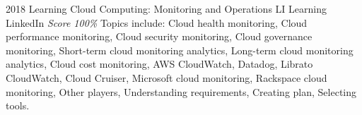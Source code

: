 \documentclass[11pt,a4paper]{moderncv}
\begin{document}
\cventry
    {2018}
    {Learning Cloud Computing: Monitoring and Operations}
    {LI Learning}
    {LinkedIn}
    {\textit{Score 100\%}}
    {
        Topics include:                                                                                           %
            Cloud health monitoring,                                                                              %
            Cloud performance monitoring,                                                                         %
            Cloud security monitoring,                                                                            %
            Cloud governance monitoring,                                                                          %
            Short-term cloud monitoring analytics,                                                                %
            Long-term cloud monitoring analytics,                                                                 %
            Cloud cost monitoring,                                                                                %
            AWS CloudWatch,                                                                                       %
            Datadog,                                                                                              %
            Librato CloudWatch,                                                                                   %
            Cloud Cruiser,                                                                                        %
            Microsoft cloud monitoring,                                                                           %
            Rackspace cloud monitoring,                                                                           %
            Other players,                                                                                        %
            Understanding requirements,                                                                           %
            Creating plan,                                                                                        %
            Selecting tools.                                                                                      %
    }
\end{document}
